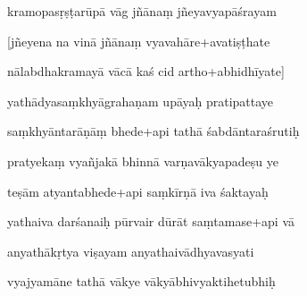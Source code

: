 \documentclass[article,12pt,a4paper]{memoir}%
\newcounter{parCount}
\begin{document}
	  
	  \pstart \leavevmode%
	kramopasṛṣṭarūpā vāg jñānaṃ jñeyavyapāśrayam 
	{}
	\pend%
      

	  
	  \pstart {} [jñeyena na vinā jñānaṃ vyavahāre+avatiṣṭhate 
	{}
	\pend%
      

	  
	  \pstart \leavevmode%
	nālabdhakramayā vācā kaś cid artho+abhidhīyate] 
	{}
	\pend%
      

	  
	  \pstart {} yathādyasaṃkhyāgrahaṇam upāyaḥ pratipattaye 
	{}
	\pend%
      

	  
	  \pstart \leavevmode%
	saṃkhyāntarāṇāṃ bhede+api tathā śabdāntaraśrutiḥ 
	{}
	\pend%
      

	  
	  \pstart {} pratyekaṃ vyañjakā bhinnā varṇavākyapadeṣu ye 
	{}
	\pend%
      

	  
	  \pstart \leavevmode%
	teṣām atyantabhede+api saṃkīrṇā iva śaktayaḥ 
	{}
	\pend%
      

	  
	  \pstart {} yathaiva darśanaiḥ pūrvair dūrāt saṃtamase+api vā 
	{}
	\pend%
      

	  
	  \pstart \leavevmode%
	anyathākṛtya viṣayam anyathaivādhyavasyati 
	{}
	\pend%
      

	  
	  \pstart {} vyajyamāne tathā vākye vākyābhivyaktihetubhiḥ 
	{}
	\pend%
      
\end{document}
